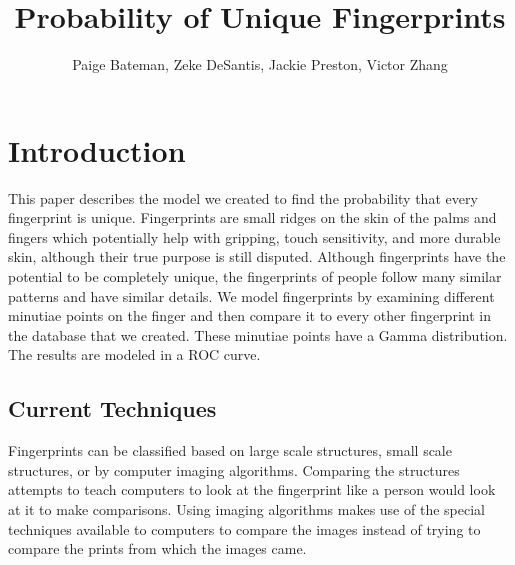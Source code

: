 \documentclass[a4paper]{article}
\title{Probability of Unique Fingerprints}
\author{Paige Bateman, Zeke DeSantis, Jackie Preston, Victor Zhang}
\begin{document}
\maketitle

\tableofcontents

\section{Introduction}

This paper describes the model we created to find the probability that every fingerprint is unique. Fingerprints are small ridges on the skin of the palms and fingers which potentially help with gripping, touch sensitivity, and more durable skin, although their true purpose is still disputed. Although fingerprints have the potential to be completely unique, the fingerprints of people follow many similar patterns and have similar details.  We model fingerprints by examining different minutiae points on the finger and then compare it to every other fingerprint in the database that we created. These minutiae points have a Gamma distribution. The results are modeled in a ROC curve. 

\subsection{Current Techniques}
Fingerprints can be classified based on large scale structures, small scale structures, or by computer imaging algorithms. Comparing the structures attempts to teach computers to look at the fingerprint like a person would look at it to make comparisons. Using imaging algorithms makes use of the special techniques available to computers to compare the images instead of trying to compare the prints from which the images came.
\end{document}
